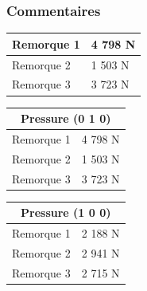 \documentclass[handout]{beamer}
\begin{document}
\begin{frame}
	\frametitle{Commentaires}
\begin{center}\begin{tabular}{|l|l|}
\hline
Remorque 1 & 4 798 N\\
\hline
Remorque 2 & 1 503 N\\
\hline
Remorque 3 & 3 723 N\\
\hline
\end{tabular}\end{center}

\begin{center}\begin{tabular}{|l|l|}
	\hline
	\multicolumn{2}{|c|}{Pressure (0 1 0)} \\
	\hline
	Remorque 1 & 4 798 N\\
	\hline
	Remorque 2 & 1 503 N\\
	\hline
	Remorque 3 & 3 723 N\\
	\hline
\end{tabular}\end{center}

\begin{center}\begin{tabular}{|l|l|}
	\hline
	\multicolumn{2}{|c|}{Pressure (1 0 0)} \\
	\hline
	Remorque 1 & 2 188 N\\
	\hline
	Remorque 2 & 2 941 N\\
	\hline
	Remorque 3 & 2 715 N\\
	\hline
\end{tabular}\end{center}
\end{frame}
\end{document}
